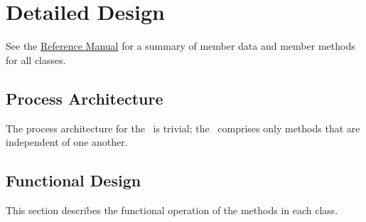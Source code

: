 
%
%
% 
%

\section{Detailed Design}
See the \href{file:refman.pdf}{Reference Manual}\cite{derivedstatebib:ReferenceManual} for a summary of member data and member methods for all classes.  

\subsection{Process Architecture}
The process architecture for the \LVLHDesc\ is trivial; the \LVLHDesc\ comprises only methods that are independent of one another.

\subsection{Functional Design}
This section describes the functional operation of the methods in each class.

